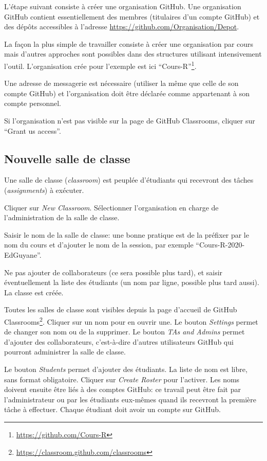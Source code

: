 \documentclass[
  12pt,
  french,
  a4paper,
  extrafontsizes,onecolumn,openright
  ]{memoir}
\begin{document}
L'étape suivant consiste à créer une organisation GitHub.
Une organisation GitHub contient essentiellement des membres (titulaires d'un compte GitHub) et des dépôts accessibles à l'adresse \url{https://github.com/Organisation/Depot}.

La façon la plus simple de travailler consiste à créer une organisation par cours mais d'autres approches sont possibles dans des structures utilisant intensivement l'outil.
L'organisation crée pour l'exemple est ici \enquote{Cours-R}\footnote{\url{https://github.com/Cours-R}}.

Une adresse de messagerie est nécessaire (utiliser la même que celle de son compte GitHub) et l'organisation doit être déclarée comme appartenant à son compte personnel.

Si l'organisation n'est pas visible sur la page de GitHub Classrooms, cliquer sur \enquote{Grant us access}.

\hypertarget{nouvelle-salle-de-classe}{%
\subsection{Nouvelle salle de classe}\label{nouvelle-salle-de-classe}}

Une salle de classe (\emph{classroom}) est peuplée d'étudiants qui recevront des tâches (\emph{assignments}) à exécuter.

Cliquer sur \emph{New Classroom}.
Sélectionner l'organisation en charge de l'administration de la salle de classe.

Saisir le nom de la salle de classe: une bonne pratique est de la préfixer par le nom du cours et d'ajouter le nom de la session, par exemple \enquote{Cours-R-2020-EdGuyane}.

Ne pas ajouter de collaborateurs (ce sera possible plus tard), et saisir éventuellement la liste des étudiants (un nom par ligne, possible plus tard aussi).
La classe est créée.

Toutes les salles de classe sont visibles depuis la page d'accueil de GitHub Classrooms\footnote{\url{https://classroom.github.com/classrooms}}.
Cliquer sur un nom pour en ouvrir une.
Le bouton \emph{Settings} permet de changer son nom ou de la supprimer.
Le bouton \emph{TAs and Admins} permet d'ajouter des collaborateurs, c'est-à-dire d'autres utilisateurs GitHub qui pourront administrer la salle de classe.

Le bouton \emph{Students} permet d'ajouter des étudiants.
La liste de nom est libre, sans format obligatoire.
Cliquer sur \emph{Create Roster} pour l'activer.
Les noms doivent ensuite être liés à des comptes GitHub: ce travail peut être fait par l'administrateur ou par les étudiants eux-mêmes quand ils recevront la première tâche à effectuer.
Chaque étudiant doit avoir un compte sur GitHub.
\end{document}
